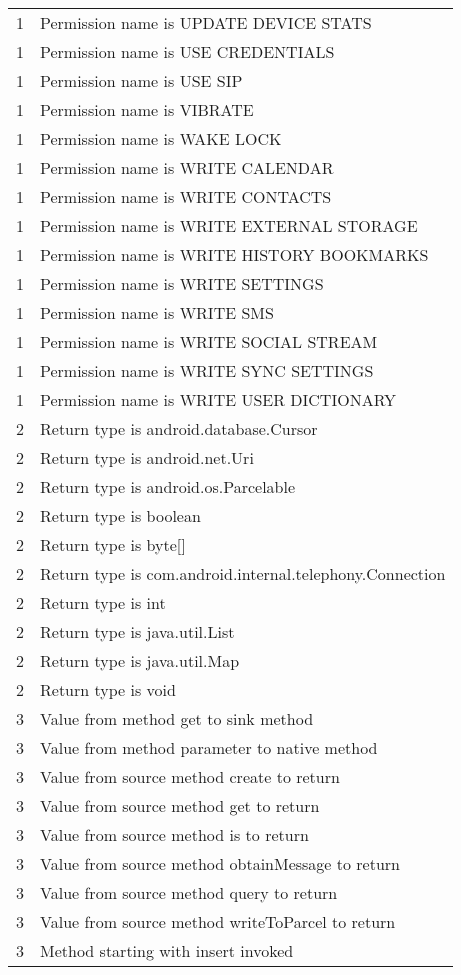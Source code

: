 \begin{center}
\begin{longtable}{l|l}
    1 & Permission name is UPDATE DEVICE STATS \\
    1 & Permission name is USE CREDENTIALS \\
    1 & Permission name is USE SIP \\
    1 & Permission name is VIBRATE \\
    1 & Permission name is WAKE LOCK \\
    1 & Permission name is WRITE CALENDAR \\
    1 & Permission name is WRITE CONTACTS \\
    1 & Permission name is WRITE EXTERNAL STORAGE \\
    1 & Permission name is WRITE HISTORY BOOKMARKS \\
    1 & Permission name is WRITE SETTINGS \\
    1 & Permission name is WRITE SMS \\
    1 & Permission name is WRITE SOCIAL STREAM \\
    1 & Permission name is WRITE SYNC SETTINGS \\
    1 & Permission name is WRITE USER DICTIONARY \\
    2 & Return type is android.database.Cursor \\
    2 & Return type is android.net.Uri \\
    2 & Return type is android.os.Parcelable \\
    2 & Return type is boolean \\
    2 & Return type is byte[] \\
    2 & Return type is com.android.internal.telephony.Connection \\
    2 & Return type is int \\
    2 & Return type is java.util.List \\
    2 & Return type is java.util.Map \\
    2 & Return type is void \\
    3 & Value from method get to sink method \\
    3 & Value from method parameter to native method \\
    3 & Value from source method create to return \\
    3 & Value from source method get to return \\
    3 & Value from source method is to return \\
    3 & Value from source method obtainMessage to return \\
    3 & Value from source method query to return \\
    3 & Value from source method writeToParcel to return \\
    3 & Method starting with insert invoked \\
    \bottomrule
    \end{longtable}
    \end{center}
    
    